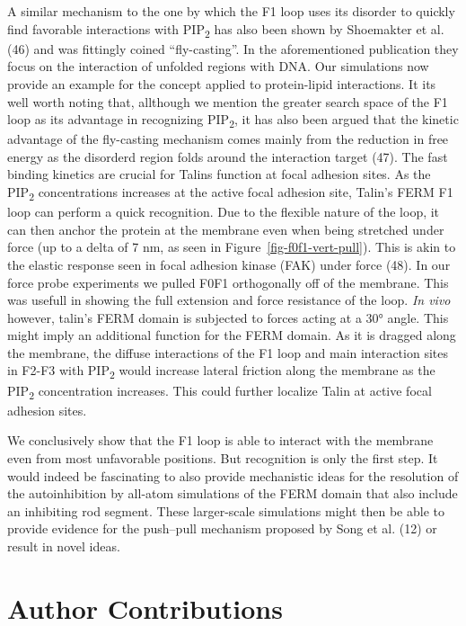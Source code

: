 \documentclass[
  letterpaper,
  DIV=11,
  numbers=noendperiod]{scrartcl}
\begin{document}
A similar mechanism to the one by which the F1 loop uses its disorder to
quickly find favorable interactions with PIP\textsubscript{2} has also
been shown by Shoemakter et al. (46) and was fittingly coined
``fly-casting''. In the aforementioned publication they focus on the
interaction of unfolded regions with DNA. Our simulations now provide an
example for the concept applied to protein-lipid interactions. It its
well worth noting that, allthough we mention the greater search space of
the F1 loop as its advantage in recognizing PIP\textsubscript{2}, it has
also been argued that the kinetic advantage of the fly-casting mechanism
comes mainly from the reduction in free energy as the disorderd region
folds around the interaction target (47). The fast binding kinetics are
crucial for Talins function at focal adhesion sites. As the
PIP\textsubscript{2} concentrations increases at the active focal
adhesion site, Talin's FERM F1 loop can perform a quick recognition. Due
to the flexible nature of the loop, it can then anchor the protein at
the membrane even when being stretched under force (up to a delta of 7
nm, as seen in Figure~\ref{fig-f0f1-vert-pull}). This is akin to the
elastic response seen in focal adhesion kinase (FAK) under force (48).
In our force probe experiments we pulled F0F1 orthogonally off of the
membrane. This was usefull in showing the full extension and force
resistance of the loop. \emph{In vivo} however, talin's FERM domain is
subjected to forces acting at a 30° angle. This might imply an
additional function for the FERM domain. As it is dragged along the
membrane, the diffuse interactions of the F1 loop and main interaction
sites in F2-F3 with PIP\textsubscript{2} would increase lateral friction
along the membrane as the PIP\textsubscript{2} concentration increases.
This could further localize Talin at active focal adhesion sites.

We conclusively show that the F1 loop is able to interact with the
membrane even from most unfavorable positions. But recognition is only
the first step. It would indeed be fascinating to also provide
mechanistic ideas for the resolution of the autoinhibition by all-atom
simulations of the FERM domain that also include an inhibiting rod
segment. These larger-scale simulations might then be able to provide
evidence for the push--pull mechanism proposed by Song et al. (12) or
result in novel ideas.

\hypertarget{author-contributions}{%
\section{Author Contributions}\label{author-contributions}}
\end{document}
